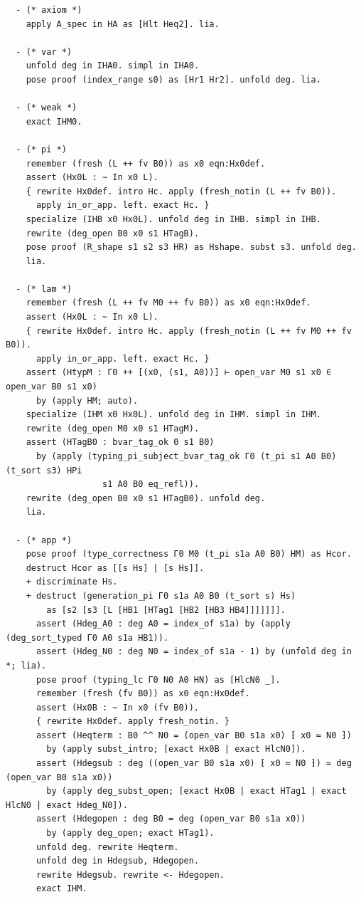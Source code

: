 \begin{latin}
\begin{verbatim}
  - (* axiom *)
    apply A_spec in HA as [Hlt Heq2]. lia.

  - (* var *)
    unfold deg in IHA0. simpl in IHA0.
    pose proof (index_range s0) as [Hr1 Hr2]. unfold deg. lia.

  - (* weak *)
    exact IHM0.

  - (* pi *)
    remember (fresh (L ++ fv B0)) as x0 eqn:Hx0def.
    assert (Hx0L : ~ In x0 L).
    { rewrite Hx0def. intro Hc. apply (fresh_notin (L ++ fv B0)).
      apply in_or_app. left. exact Hc. }
    specialize (IHB x0 Hx0L). unfold deg in IHB. simpl in IHB.
    rewrite (deg_open B0 x0 s1 HTagB).
    pose proof (R_shape s1 s2 s3 HR) as Hshape. subst s3. unfold deg.
    lia.

  - (* lam *)
    remember (fresh (L ++ fv M0 ++ fv B0)) as x0 eqn:Hx0def.
    assert (Hx0L : ~ In x0 L).
    { rewrite Hx0def. intro Hc. apply (fresh_notin (L ++ fv M0 ++ fv B0)).
      apply in_or_app. left. exact Hc. }
    assert (HtypM : Γ0 ++ [(x0, (s1, A0))] ⊢ open_var M0 s1 x0 ∈ open_var B0 s1 x0)
      by (apply HM; auto).
    specialize (IHM x0 Hx0L). unfold deg in IHM. simpl in IHM.
    rewrite (deg_open M0 x0 s1 HTagM).
    assert (HTagB0 : bvar_tag_ok 0 s1 B0)
      by (apply (typing_pi_subject_bvar_tag_ok Γ0 (t_pi s1 A0 B0) (t_sort s3) HPi
                   s1 A0 B0 eq_refl)).
    rewrite (deg_open B0 x0 s1 HTagB0). unfold deg.
    lia.

  - (* app *)
    pose proof (type_correctness Γ0 M0 (t_pi s1a A0 B0) HM) as Hcor.
    destruct Hcor as [[s Hs] | [s Hs]].
    + discriminate Hs.
    + destruct (generation_pi Γ0 s1a A0 B0 (t_sort s) Hs)
        as [s2 [s3 [L [HB1 [HTag1 [HB2 [HB3 HB4]]]]]]].
      assert (Hdeg_A0 : deg A0 = index_of s1a) by (apply (deg_sort_typed Γ0 A0 s1a HB1)).
      assert (Hdeg_N0 : deg N0 = index_of s1a - 1) by (unfold deg in *; lia).
      pose proof (typing_lc Γ0 N0 A0 HN) as [HlcN0 _].
      remember (fresh (fv B0)) as x0 eqn:Hx0def.
      assert (Hx0B : ~ In x0 (fv B0)).
      { rewrite Hx0def. apply fresh_notin. }
      assert (Heqterm : B0 ^^ N0 = (open_var B0 s1a x0) ⁅ x0 ≔ N0 ⁆)
        by (apply subst_intro; [exact Hx0B | exact HlcN0]).
      assert (Hdegsub : deg ((open_var B0 s1a x0) ⁅ x0 ≔ N0 ⁆) = deg (open_var B0 s1a x0))
        by (apply deg_subst_open; [exact Hx0B | exact HTag1 | exact HlcN0 | exact Hdeg_N0]).
      assert (Hdegopen : deg B0 = deg (open_var B0 s1a x0))
        by (apply deg_open; exact HTag1).
      unfold deg. rewrite Heqterm.
      unfold deg in Hdegsub, Hdegopen.
      rewrite Hdegsub. rewrite <- Hdegopen.
      exact IHM.


\end{verbatim}
\end{latin}
